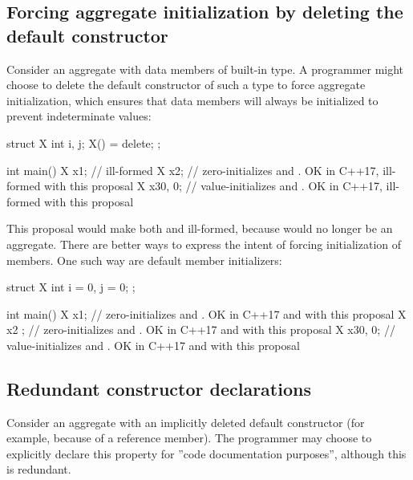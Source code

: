 \subsection{Forcing aggregate initialization by deleting the default constructor}
\label{subsec:usecase_ub}

Consider an aggregate with data members of built-in type. A programmer might choose to delete the default constructor of such a type to force aggregate initialization, which ensures that data members will always be initialized to prevent indeterminate values:

\begin{minipage}{\textwidth}
\begin{codeblock}
struct X {
  int i, j;
  X() = delete;
};

int main() {
  X x1;       // ill-formed
  X x2{};     //  zero-initializes  and . OK in C++17, ill-formed with this proposal
  X x3{0, 0}; // value-initializes  and . OK in C++17, ill-formed with this proposal
}
\end{codeblock}
\end{minipage}

This proposal would make both  and  ill-formed, because  would no longer be an aggregate. There are better ways to express the intent of forcing initialization of members. One such way are default member initializers:

\begin{codeblock}
struct X {
  int i = 0, j = 0;
};

int main() {
  X x1;       // zero-initializes  and . OK in C++17 and with this proposal
  X x2{} ;    // zero-initializes  and . OK in C++17 and with this proposal
  X x3{0, 0}; // value-initializes  and . OK in C++17 and with this proposal
}
\end{codeblock}


\subsection{Redundant constructor declarations}
\label{subsec:redundant_delete}

Consider an aggregate with an implicitly deleted default constructor (for example, because of a reference member). The programmer may choose to explicitly declare this property for ''code documentation purposes'', although this is redundant. 

